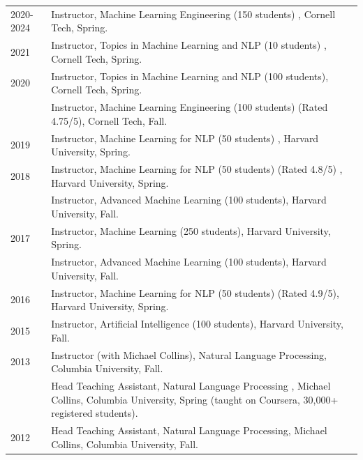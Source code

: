 \documentclass[10pt]{article}
\begin{document}
{\hspace{-1cm} \begin{tabular}{lp{11.5cm}}
	2020-2024 & \ind  Instructor, Machine Learning Engineering (150 students) , Cornell Tech, Spring.                                                                       \\
	2021      & \ind  Instructor, Topics in Machine Learning and NLP (10 students) , Cornell Tech, Spring.                                                                  \\
	2020      & \ind  Instructor, Topics in Machine Learning and NLP (100 students), Cornell Tech, Spring.                                                                  \\
	          & \ind  Instructor,  Machine Learning Engineering (100 students) (Rated 4.75/5), Cornell Tech, Fall.                                                          \\

	2019      & \ind  Instructor, Machine Learning for NLP (50 students) , Harvard University, Spring.                                                                      \\

	2018      & \ind  Instructor, Machine Learning for NLP (50 students) (Rated 4.8/5) , Harvard University, Spring.                                                        \\
	          & \ind  Instructor, Advanced Machine Learning (100 students), Harvard University, Fall.                                                                       \\
	2017      & \ind  Instructor, Machine Learning (250 students), Harvard University, Spring.                                                                              \\
	          & \ind  Instructor, Advanced Machine Learning (100 students), Harvard University, Fall.                                                                       \\
	2016      & \ind  Instructor, Machine Learning for NLP (50 students) (Rated 4.9/5), Harvard University, Spring.                                                         \\
	2015      & \ind  Instructor, Artificial Intelligence (100 students), Harvard University, Fall.                                                                         \\
	2013      & \ind  Instructor (with Michael Collins), Natural Language Processing, Columbia University, Fall.                                                            \\
	          & \ind Head Teaching Assistant, Natural Language Processing , Michael Collins, Columbia University, Spring (taught on Coursera, 30,000+ registered students). \\
	2012      & \ind Head Teaching Assistant, Natural Language Processing, Michael Collins, Columbia University, Fall.                                                      \\
\end{tabular}

}
\end{document}
